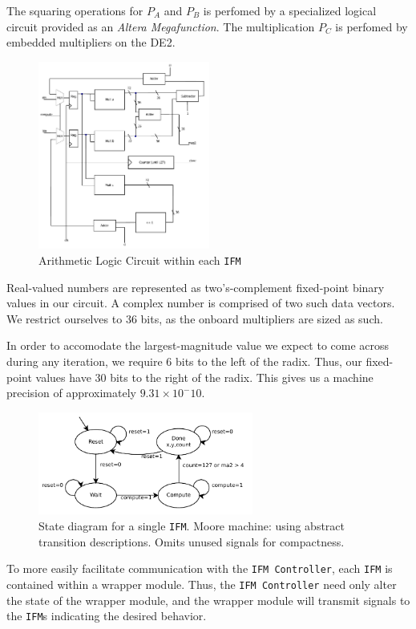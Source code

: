\documentclass{article}
\begin{document}
The squaring operations for $P_A$ and $P_B$ is perfomed by a specialized logical circuit provided as an \textit{Altera Megafunction}. The multiplication $P_C$ is perfomed by embedded multipliers on the DE2.

\begin{figure}[H]
  \centering
    \includegraphics[width=160pt]{block_diagrams/ifm.pdf}
  \caption{Arithmetic Logic Circuit within each \texttt{IFM}}
\end{figure}

Real-valued numbers are represented as two's-complement fixed-point binary
values in our circuit. A complex number is comprised of two such data vectors. 
We restrict ourselves to 36 bits, as the onboard multipliers
are sized as such. 

In order to accomodate the largest-magnitude value we
expect to come across during any iteration, we require 6 bits to the
left of the radix. Thus, our fixed-point values have 30 bits to the
right of the radix. This gives us a machine precision of approximately
$9.31 \times 10 ^ -10$.

\begin{figure}[H]
  \centering
    \includegraphics[width=200pt]{state_diagrams/ifm.pdf}
  \caption{State diagram for a single \texttt{IFM}. Moore
    machine: using abstract transition descriptions. Omits unused
    signals for compactness.}
\end{figure}


To more easily facilitate communication with the \texttt{IFM Controller}, each \texttt{IFM} is contained within a wrapper module.
Thus, the \texttt{IFM Controller} need only alter the state of the wrapper module, and the wrapper module will transmit signals to the \texttt{IFM}s indicating the desired behavior.
\end{document}
